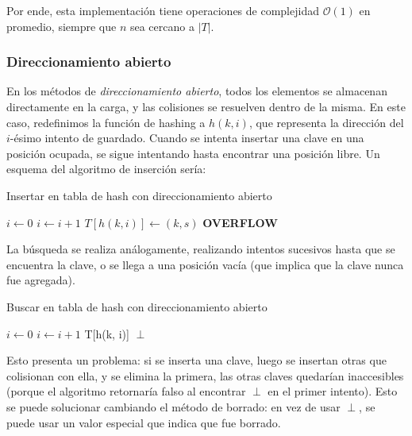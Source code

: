\documentclass{article}
\newcommand{\BigO}[1]{{\mathcal{O}(#1)}}
\begin{document}
Por ende, esta implementación tiene operaciones de complejidad $\BigO{1}$ en promedio, siempre que $n$ sea cercano a $|T|$.

\subsubsection{Direccionamiento abierto}

En los métodos de \textit{direccionamiento abierto}, todos los elementos se almacenan directamente en la carga, y las colisiones se resuelven dentro de la misma. En este caso, redefinimos la función de hashing a $h(k, i)$, que representa la dirección del $i$-ésimo intento de guardado. Cuando se intenta insertar una clave en una posición ocupada, se sigue intentando hasta encontrar una posición libre. Un esquema del algoritmo de inserción sería:
\begin{algorithm}[H]
    \caption*{Insertar en tabla de hash con direccionamiento abierto}
    \begin{algorithmic}
        \State $i \gets 0$
        \State $i \gets i + 1$
        \EndWhile
        \State $T[h(k, i)] \gets (k, s)$
        \Else
        \State \textbf{OVERFLOW}
        \EndIf
        \EndFunction
    \end{algorithmic}
\end{algorithm}

La búsqueda se realiza análogamente, realizando intentos sucesivos hasta que se encuentra la clave, o se llega a una posición vacía (que implica que la clave nunca fue agregada).
\begin{algorithm}[H]
    \caption*{Buscar en tabla de hash con direccionamiento abierto}
    \begin{algorithmic}
        \State $i \gets 0$
        \State $i \gets i + 1$
        \EndWhile
        \State \Return T[h(k, i)]
        \Else
        \State \Return $\perp$
        \EndIf
        \EndFunction
    \end{algorithmic}
\end{algorithm}

Esto presenta un problema: si se inserta una clave, luego se insertan otras que colisionan con ella, y se elimina la primera, las otras claves quedarían inaccesibles (porque el algoritmo retornaría falso al encontrar $\perp$ en el primer intento). Esto se puede solucionar cambiando el método de borrado: en vez de usar $\perp$, se puede usar un valor especial que indica que fue borrado.
\end{document}

